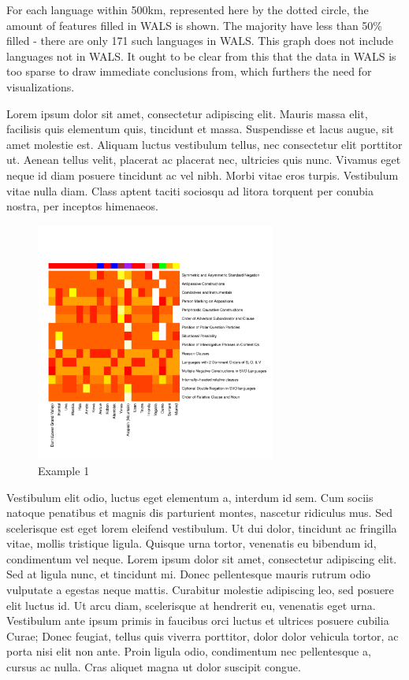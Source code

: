\documentclass[11pt]{article}
\begin{document}
For each language within 500km, represented here by the dotted circle, the amount of features filled in WALS is shown. The majority have less than 50\% filled - there are only 171 such languages in WALS. This graph does not include languages not in WALS. It ought to be clear from this that the data in WALS is too sparse to draw immediate conclusions from, which furthers the need for visualizations. 



Lorem ipsum dolor sit amet, consectetur adipiscing elit. Mauris massa elit, facilisis quis elementum quis, tincidunt et massa. Suspendisse et lacus augue, sit amet molestie est. Aliquam luctus vestibulum tellus, nec consectetur elit porttitor ut. Aenean tellus velit, placerat ac placerat nec, ultricies quis nunc. Vivamus eget neque id diam posuere tincidunt ac vel nibh. Morbi vitae eros turpis. Vestibulum vitae nulla diam. Class aptent taciti sociosqu ad litora torquent per conubia nostra, per inceptos himenaeos.
\begin{figure}[h]
\includegraphics[width=3.1in]
{graph2.pdf} 
\caption{Example 1} 
\label{fig:sparse} 
\end{figure}
Vestibulum elit odio, luctus eget elementum a, interdum id sem. Cum sociis natoque penatibus et magnis dis parturient montes, nascetur ridiculus mus. Sed scelerisque est eget lorem eleifend vestibulum. Ut dui dolor, tincidunt ac fringilla vitae, mollis tristique ligula. Quisque urna tortor, venenatis eu bibendum id, condimentum vel neque. Lorem ipsum dolor sit amet, consectetur adipiscing elit. Sed at ligula nunc, et tincidunt mi. Donec pellentesque mauris rutrum odio vulputate a egestas neque mattis. Curabitur molestie adipiscing leo, sed posuere elit luctus id. Ut arcu diam, scelerisque at hendrerit eu, venenatis eget urna. Vestibulum ante ipsum primis in faucibus orci luctus et ultrices posuere cubilia Curae; Donec feugiat, tellus quis viverra porttitor, dolor dolor vehicula tortor, ac porta nisi elit non ante. Proin ligula odio, condimentum nec pellentesque a, cursus ac nulla. Cras aliquet magna ut dolor suscipit congue.
\end{document}
